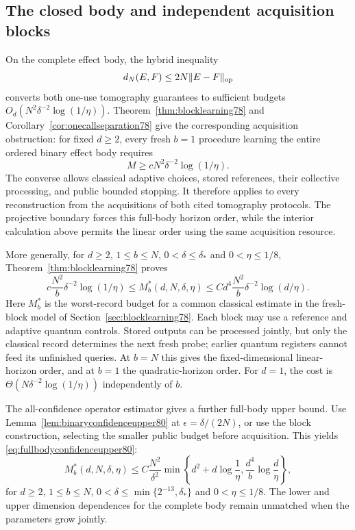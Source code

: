 \subsection{The closed body and independent acquisition blocks}
On the complete effect body, the hybrid inequality
\[
 d_N(E,F)\le2N\|E-F\|_{\rm op}
\]
converts both one-use tomography guarantees to sufficient budgets
$O_d(N^2\delta^{-2}\log(1/\eta))$.  Theorem~\ref{thm:blocklearning78}
and Corollary~\ref{cor:onecallseparation78} give the corresponding
acquisition obstruction: for fixed $d\ge2$, every fresh $b=1$
procedure learning the entire ordered binary effect body requires
\[
 M\ge cN^2\delta^{-2}\log(1/\eta).
\]
The converse allows classical adaptive choices, stored references,
their collective processing, and public bounded stopping.  It
therefore applies to every reconstruction from the acquisitions of
both cited tomography protocols.  The projective boundary forces
this full-body horizon order, while the interior calculation above
permits the linear order using the same acquisition resource.

More generally, for $d\ge2$, $1\le b\le N$,
$0<\delta\le\delta_*$ and $0<\eta\le1/8$,
Theorem~\ref{thm:blocklearning78} proves
\[
 c\frac{N^2}{b}\delta^{-2}\log(1/\eta)
 \le M_b^*(d,N,\delta,\eta)
 \le Cd^4\frac{N^2}{b}\delta^{-2}\log(d/\eta).
\]
Here $M_b^*$ is the worst-record budget for a common classical
estimate in the fresh-block model of
Section~\ref{sec:blocklearning78}.  Each block may use a reference
and adaptive quantum controls.  Stored outputs can be processed
jointly, but only the classical record determines the next fresh
probe; earlier quantum registers cannot feed its unfinished queries.
At $b=N$ this gives the fixed-dimensional linear-horizon order,
and at $b=1$ the quadratic-horizon order.  For $d=1$, the cost is
$\Theta(N\delta^{-2}\log(1/\eta))$ independently of $b$.

The all-confidence operator estimator gives a further full-body
upper bound.  Use Lemma~\ref{lem:binaryconfidenceupper80} at
$\epsilon=\delta/(2N)$, or use the block construction, selecting
the smaller public budget before acquisition.  This yields
\eqref{eq:fullbodyconfidenceupper80}:
\[
 M_b^*(d,N,\delta,\eta)
 \le C\frac{N^2}{\delta^2}
       \min\!\left\{d^2+d\log\frac1\eta,
                    \frac{d^4}{b}\log\frac d\eta\right\},
\]
for $d\ge2$, $1\le b\le N$,
$0<\delta\le\min\{2^{-13},\delta_*\}$ and
$0<\eta\le1/8$.  The lower and upper dimension dependences for
the complete body remain unmatched when the parameters grow jointly.

